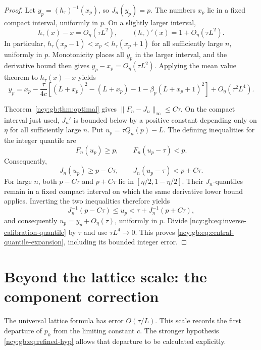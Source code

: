 \documentclass[11pt,letterpaper]{article}
\numberwithin{equation}{section}
\theoremstyle{remark}\newtheorem{remark}[theorem]{Remark}
\theoremstyle{definition}\newtheorem{definition}[theorem]{Definition}\theoremstyle{plain}
\begin{document}
\begin{proof}
Let $y_p=(h_\tau)^{-1}(x_p)$, so $J_n(y_p)=p$.
The numbers $x_p$ lie in a fixed compact interval, uniformly in $p$.
On a slightly larger interval,
\[
 h_\tau(x)-x=O_\eta(\tau L^2),\qquad
 (h_\tau)'(x)=1+O_\eta(\tau L^2).
\]
In particular, $h_\tau(x_p-1)<x_p<h_\tau(x_p+1)$ for all
sufficiently large $n$, uniformly in $p$.
Monotonicity places all $y_p$ in the larger interval, and the derivative
bound then gives $y_p-x_p=O_\eta(\tau L^2)$.
Applying the mean value theorem to $h_\tau(x)-x$ yields
\begin{equation}
\label{ncy:gb:eq:inverse-calibration-quantile}
 y_p=x_p-\frac{\tau}{4c}
  \left[(L+x_p)^2-(L+x_p)-1
                  -\beta_p(L+x_p+1)^2\right]
  +O_\eta(\tau^2L^4).
\end{equation}

Theorem~\ref{ncy:gb:thm:optimal} gives
$\|F_n-J_n\|_\infty\le C\tau$.
On the compact interval just used, $J_n'$ is bounded below by
a positive constant depending only on $\eta$ for all sufficiently
large $n$.  Put $u_p=\tau Q_n(p)-L$.
The defining inequalities for the integer quantile are
\[
 F_n(u_p)\ge p,\qquad F_n(u_p-\tau)<p.
\]
Consequently,
\[
 J_n(u_p)\ge p-C\tau,\qquad
 J_n(u_p-\tau)<p+C\tau.
\]
For large $n$, both $p-C\tau$ and $p+C\tau$ lie in
$[\eta/2,1-\eta/2]$.  Their $J_n$-quantiles remain in a fixed compact
interval on which the same derivative lower bound applies.  Inverting
the two inequalities therefore yields
\[
 J_n^{-1}(p-C\tau)\le u_p
 <\tau+J_n^{-1}(p+C\tau),
\]
and consequently $u_p=y_p+O_\eta(\tau)$, uniformly in $p$.
Divide \eqref{ncy:gb:eq:inverse-calibration-quantile} by $\tau$ and use
$\tau L^4\to0$.  This proves
\eqref{ncy:gb:eq:central-quantile-expansion}, including its bounded integer
error.
\end{proof}

\section{Beyond the lattice scale: the component correction}
\label{ncy:gb:sec:refinement}

The universal lattice formula has error \(O(\tau/L)\).
This scale records the first departure of \(p_k\) from the limiting
constant \(c\). The stronger hypothesis \eqref{ncy:gb:eq:refined-hyp}
allows that departure to be calculated explicitly.
\end{document}
